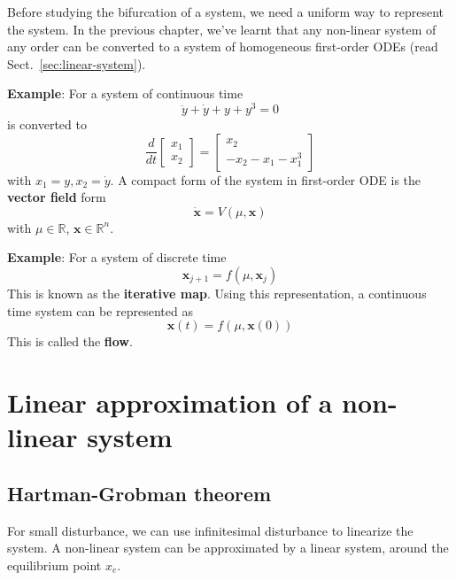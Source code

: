Before studying the bifurcation of a system, we need a uniform way to
represent the system. In the previous chapter, we've learnt that any
non-linear system of any order can be converted to a system of
homogeneous first-order ODEs (read Sect.~\ref{sec:linear-system}).

{\bf Example}: For a system of continuous time
\begin{equation}
  \label{eq:576}
  \ddot{y} + \dot{y} + y + y^3 = 0
\end{equation}
is converted to
\begin{equation}
  \label{eq:631}
  \frac{d}{dt}\left[
    \begin{array}{c}
      x_1 \\ x_2
    \end{array} \right]
 = \left[
   \begin{array}{c}
     x_2 \\
     -x_2 - x_1 - x_1^3
   \end{array}
\right]
\end{equation}
with $x_1=y, x_2=\dot{y}$. A compact form of the system in first-order
ODE is the {\bf vector field} form
\begin{equation}
  \label{eq:632}
  \mathbf{\dot{x}} = V(\mu, \mathbf{x})
\end{equation}
with $\mu\in \mathbb{R}$, $\mathbf{x}\in \mathbb{R}^n$.

{\bf Example}: For a system of discrete time
\begin{equation}
  \label{eq:633}
 \mathbf{x}_{j+1} = f(\mu,\mathbf{x}_j)
\end{equation}
This is known as the {\bf iterative map}.
Using this representation, a continuous time system can be represented
as 
\begin{equation}
  \label{eq:635}
  \mathbf{x}(t) = f(\mu,\mathbf{x}(0))
\end{equation}
This is called the {\bf flow}. 

\section{Linear approximation of a non-linear system}
\label{sec:linear-appr-non-linear}

\subsection{Hartman-Grobman theorem}
\label{sec:hartm-grobm-theor}

For small disturbance, we can use infinitesimal disturbance to
linearize the system.  A non-linear system can be approximated by a
linear system, around the equilibrium point $x_e$.

